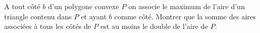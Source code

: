 A tout côté $b$ d'un polygone convexe $P$ on associe le maximum de l'aire d'un triangle contenu dans $P$ et
ayant $b$ comme côté. Montrer que la somme des aires associées à tous les côtés de $P$ est au moins le double
de l'aire de $P$.
